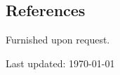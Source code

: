 \documentclass[11pt, a4paper, DIV=12]{scrartcl}
\begin{document}
		








\subsection*{References}

Furnished upon request.




\vfill{} 
\begin{center}
{\scriptsize Last updated: \today}
\end{center}
\end{document}
